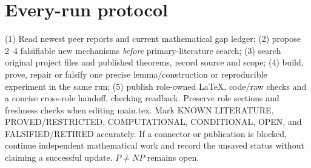\documentclass[11pt]{article}
\begin{document}
\section*{Every-run protocol}
(1) Read newest peer reports and current mathematical gap ledger; (2) propose 2--4 falsifiable new mechanisms \emph{before} primary-literature search; (3) search original project files and published theorems, record source and scope; (4) build, prove, repair or falsify one precise lemma/construction or reproducible experiment in the same run; (5) publish role-owned LaTeX, code/raw checks and a concise cross-role handoff, checking readback. Preserve role sections and freshness checks when editing main.tex. Mark KNOWN LITERATURE, PROVED/RESTRICTED, COMPUTATIONAL, CONDITIONAL, OPEN, and FALSIFIED/RETIRED accurately. If a connector or publication is blocked, continue independent mathematical work and record the unsaved status without claiming a successful update. $P\ne NP$ remains open.
\end{document}
